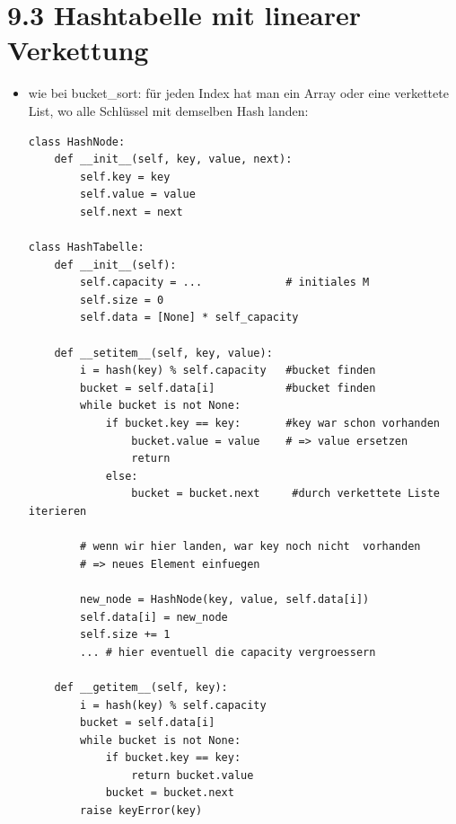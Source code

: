 \section*{9.3 Hashtabelle mit linearer Verkettung}
\begin{itemize}
    \item wie bei bucket\_sort: für jeden Index hat man ein Array oder eine verkettete List, wo alle Schlüssel mit demselben Hash landen:
    \begin{verbatim}
class HashNode:
    def __init__(self, key, value, next):
        self.key = key
        self.value = value
        self.next = next

class HashTabelle:
    def __init__(self):
        self.capacity = ...             # initiales M
        self.size = 0
        self.data = [None] * self_capacity

    def __setitem__(self, key, value):
        i = hash(key) % self.capacity   #bucket finden
        bucket = self.data[i]           #bucket finden
        while bucket is not None:
            if bucket.key == key:       #key war schon vorhanden
                bucket.value = value    # => value ersetzen
                return
            else:
                bucket = bucket.next     #durch verkettete Liste iterieren

        # wenn wir hier landen, war key noch nicht  vorhanden
        # => neues Element einfuegen

        new_node = HashNode(key, value, self.data[i])
        self.data[i] = new_node
        self.size += 1
        ... # hier eventuell die capacity vergroessern

    def __getitem__(self, key):
        i = hash(key) % self.capacity
        bucket = self.data[i]
        while bucket is not None:
            if bucket.key == key:
                return bucket.value
            bucket = bucket.next
        raise keyError(key)
    \end{verbatim}
\end{itemize}


